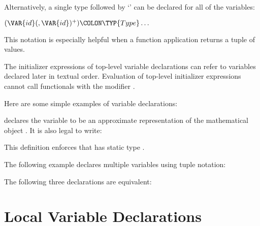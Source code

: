 Alternatively, a single type followed by `\EXP{\ldots}'
can be declared for all of the variables:
\begin{Fortress}
\((\VAR{id}(, \VAR{id})^+)\COLON \TYP{Type}\ldots\)
\end{Fortress}
This notation is especially helpful when a function application returns a tuple of values.

The initializer expressions of top-level variable declarations can refer to
variables declared later in textual order.
\label{decl-io}
Evaluation of top-level initializer expressions cannot call
functionals with the modifier .


Here are some simple examples of variable declarations:

declares the variable \EXP{\pi}
to be an approximate representation of the mathematical object \EXP{\pi}.
It is also legal to write:

This definition enforces that \EXP{\pi} has static type .

The following example declares multiple variables using tuple notation:


The following three declarations are equivalent:

\vspace*{-1em}

\vspace*{-1.4em}



\section{Local Variable Declarations}


